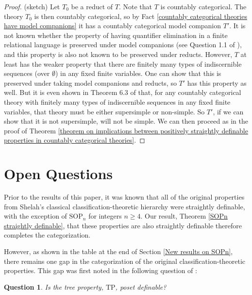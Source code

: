\documentclass[10pt,a4paper]{amsart}
\newtheorem{question}{Question}
\begin{document}
\begin{proof}

(sketch) Let $T_{0}$ be a reduct of $T$.  Note that $T$ is countably categorical. The theory  $T_{0}$ is then countably categorical, so by Fact \ref{countably categorical theories have model companions} it has a countably categorical model companion $T'$. It is not known whether the property of having quantifier elimination in a finite relational language is preserved under model companions (see Question 1.1 of \cite{bodirsky2025taking}), and this property is also not known to be preserved under reducts. However, $T$ at least has the weaker property that there are finitely many types of indiscernible sequences (over $\emptyset$) in any fixed finite variables. One can show that this is preserved under taking model companions and reducts, so $T'$ has this property as well. But it is even shown in Theorem 6.3 of \cite{baldwin2024simple} that, for any countably categorical theory with finitely many types of indiscernible sequences in any fixed finite variables, that theory must be either supersimple or non-simple. So $T'$, if we can show that it is not supersimple, will not be simple. We can then proceed as in the proof of Theorem \ref{theorem on implications between positively straightly definable properties in countably categorical theories}.

    
\end{proof}




\section{Open Questions}\label{open questions}


Prior to the results of this paper, it was known that all of the original properties from Shelah's classical classification-theoretic hierarchy were straightly definable, with the exception of $\mathrm{SOP}_{n}$ for integers $n \geq 4$. Our result, Theorem \ref{SOPn straightly definable}, that these properties are also straightly definable therefore completes the categorization.

However, as shown in the table at the end of Section \ref{New results on SOPn}, there remains one gap in the categorization of the original classification-theoretic properties. This gap was first noted in the following question of \cite{garcia2022model}:

\begin{question}
    Is the tree property, $\mathrm{TP}$, poset definable? 
\end{question}
\end{document}
